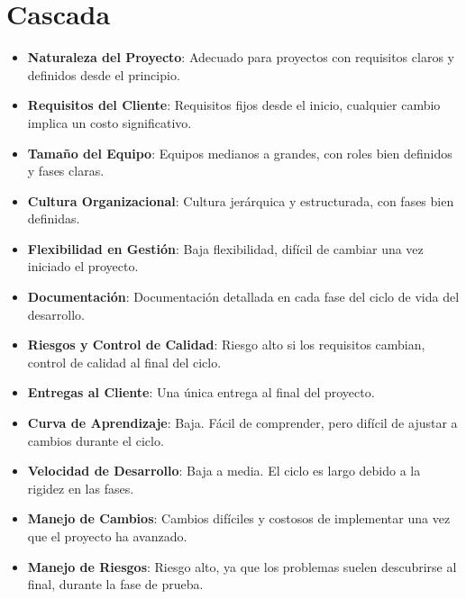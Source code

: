 \documentclass[main.tex]{subfiles}
\begin{document}
\section{Cascada}
\begin{itemize}
    \item \textbf{Naturaleza del Proyecto}: Adecuado para proyectos con requisitos claros y definidos desde el principio.
    \item \textbf{Requisitos del Cliente}: Requisitos fijos desde el inicio, cualquier cambio implica un costo significativo.
    \item \textbf{Tamaño del Equipo}: Equipos medianos a grandes, con roles bien definidos y fases claras.
    \item \textbf{Cultura Organizacional}: Cultura jerárquica y estructurada, con fases bien definidas.
    \item \textbf{Flexibilidad en Gestión}: Baja flexibilidad, difícil de cambiar una vez iniciado el proyecto.
    \item \textbf{Documentación}: Documentación detallada en cada fase del ciclo de vida del desarrollo.
    \item \textbf{Riesgos y Control de Calidad}: Riesgo alto si los requisitos cambian, control de calidad al final del ciclo.
    \item \textbf{Entregas al Cliente}: Una única entrega al final del proyecto.
    \item \textbf{Curva de Aprendizaje}: Baja. Fácil de comprender, pero difícil de ajustar a cambios durante el ciclo.
    \item \textbf{Velocidad de Desarrollo}: Baja a media. El ciclo es largo debido a la rigidez en las fases.
    \item \textbf{Manejo de Cambios}: Cambios difíciles y costosos de implementar una vez que el proyecto ha avanzado.
    \item \textbf{Manejo de Riesgos}: Riesgo alto, ya que los problemas suelen descubrirse al final, durante la fase de prueba.
\end{itemize}
\end{document}
